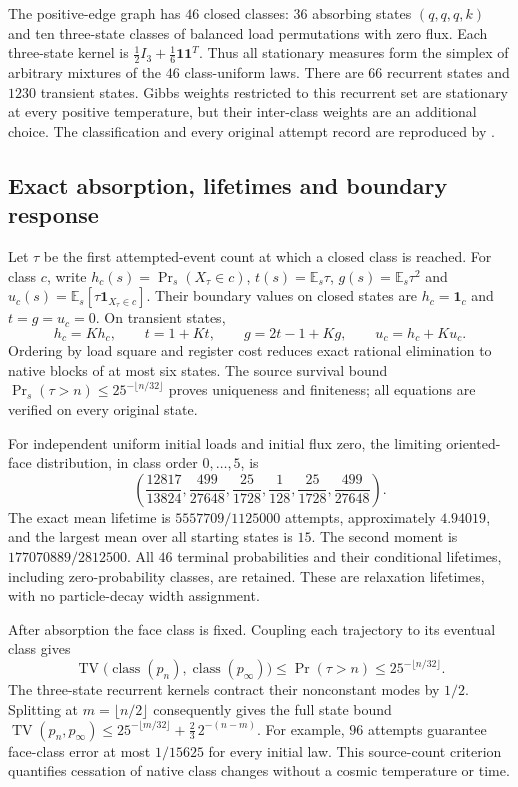 The positive-edge graph has $46$ closed classes: $36$ absorbing states
$(q,q,q,k)$ and ten three-state classes of balanced load permutations
with zero flux. Each three-state kernel is
$\frac12I_3+\frac16\mathbf1\mathbf1^T$. Thus all stationary measures form
the simplex of arbitrary mixtures of the $46$ class-uniform laws. There
are $66$ recurrent states and $1230$ transient states. Gibbs weights
restricted to this recurrent set are stationary at every positive
temperature, but their inter-class weights are an additional choice.
The classification and every original attempt record are reproduced by
 \cite{ophrepo}.

\subsection{Exact absorption, lifetimes and boundary response}

Let $\tau$ be the first attempted-event count at which a closed class
is reached. For class $c$, write $h_c(s)=\Pr_s(X_\tau\in c)$,
$t(s)=\mathbb E_s\tau$, $g(s)=\mathbb E_s\tau^2$ and
$u_c(s)=\mathbb E_s[\tau\mathbf1_{X_\tau\in c}]$.
Their boundary values on closed states are $h_c=\mathbf1_c$ and
$t=g=u_c=0$. On transient states,
\[
 h_c=Kh_c,\qquad t=1+Kt,\qquad g=2t-1+Kg,\qquad u_c=h_c+Ku_c.
\]
Ordering by load square and register cost reduces exact rational
elimination to native blocks of at most six states. The source survival
bound $\Pr_s(\tau>n)\leq25^{-\lfloor n/32\rfloor}$ proves uniqueness
and finiteness; all equations are verified on every original state.

For independent uniform initial loads and initial flux zero, the limiting
oriented-face distribution, in class order $0,\ldots,5$, is
\[
 \left(\frac{12817}{13824},\frac{499}{27648},\frac{25}{1728},
       \frac1{128},\frac{25}{1728},\frac{499}{27648}\right).
\]
The exact mean lifetime is $5557709/1125000$ attempts, approximately
$4.94019$, and the largest mean over all starting states is $15$.
The second moment is $177070889/2812500$. All $46$ terminal probabilities
and their conditional lifetimes, including zero-probability classes,
are retained. These are relaxation lifetimes, with no particle-decay
width assignment.

After absorption the face class is fixed. Coupling each trajectory to
its eventual class gives
\[
 \operatorname{TV}\bigl(\operatorname{class}(p_n),
          \operatorname{class}(p_\infty)\bigr)
 \leq\Pr(\tau>n)\leq25^{-\lfloor n/32\rfloor}.
\]
The three-state recurrent kernels contract their nonconstant modes by
$1/2$. Splitting at $m=\lfloor n/2\rfloor$ consequently gives the full
state bound
$\operatorname{TV}(p_n,p_\infty)\leq25^{-\lfloor m/32\rfloor}
+\frac23\,2^{-(n-m)}$.
For example, $96$ attempts guarantee face-class error at most $1/15625$
for every initial law. This source-count criterion quantifies cessation
of native class changes without a cosmic temperature or time.

